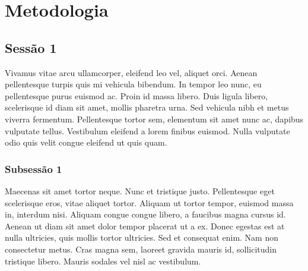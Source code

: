 \chapter{Metodologia} \label{metodologia}

\section{Sessão 1}
% 

Vivamus vitae arcu ullamcorper, eleifend leo vel, aliquet orci. Aenean pellentesque turpis quis mi vehicula bibendum. In tempor leo nunc, eu pellentesque purus euismod ac. Proin id massa libero. Duis ligula libero, scelerisque id diam sit amet, mollis pharetra urna. Sed vehicula nibh et metus viverra fermentum. Pellentesque tortor sem, elementum sit amet nunc ac, dapibus vulputate tellus. Vestibulum eleifend a lorem finibus euismod. Nulla vulputate odio quis velit congue eleifend ut quis quam.


\subsection{Subsessão 1}

Maecenas sit amet tortor neque. Nunc et tristique justo. Pellentesque eget scelerisque eros, vitae aliquet tortor. Aliquam ut tortor tempor, euismod massa in, interdum nisi. Aliquam congue congue libero, a faucibus magna cursus id. Aenean ut diam sit amet dolor tempor placerat ut a ex. Donec egestas est at nulla ultricies, quis mollis tortor ultricies. Sed et consequat enim. Nam non consectetur metus. Cras magna sem, laoreet gravida mauris id, sollicitudin tristique libero. Mauris sodales vel nisl ac vestibulum.

\clearpage
